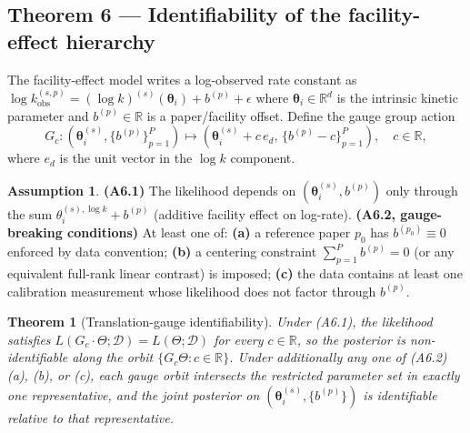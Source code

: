 \documentclass[12pt]{article}
\theoremstyle{plain}
\newtheorem{theorem}{Theorem}
\theoremstyle{definition}
\newtheorem{assumption}{Assumption}
\theoremstyle{remark}
\newcommand{\R}{\mathbb{R}}
\begin{document}
\subsection{Theorem 6 --- Identifiability of the facility-effect hierarchy}\label{sec:thm6}

The facility-effect model writes a log-observed rate constant as
$\log k_{\mathrm{obs}}^{(s,p)}=(\log k)^{(s)}(\boldsymbol\theta_i)+
b^{(p)}+\epsilon$ where $\boldsymbol\theta_i\in\R^d$ is the intrinsic
kinetic parameter and $b^{(p)}\in\R$ is a paper/facility offset.
Define the gauge group action
\[
G_c:(\boldsymbol\theta_i^{(s)},\{b^{(p)}\}_{p=1}^P) \mapsto
 (\boldsymbol\theta_i^{(s)}+c\,e_d,\,\{b^{(p)}-c\}_{p=1}^P),\quad c\in\R,
\]
where $e_d$ is the unit vector in the $\log k$ component.

\begin{assumption}\label{ass:thm6}
\textbf{(A6.1)} The likelihood depends on
$(\boldsymbol\theta_i^{(s)},b^{(p)})$ only through the sum
$\theta_i^{(s),\log k}+b^{(p)}$ (additive facility effect on
log-rate).
\textbf{(A6.2, gauge-breaking conditions)} At least one of:
\textbf{(a)} a reference paper $p_0$ has $b^{(p_0)}\equiv 0$ enforced
by data convention;
\textbf{(b)} a centering constraint $\sum_{p=1}^P b^{(p)}=0$ (or any
equivalent full-rank linear contrast) is imposed;
\textbf{(c)} the data contains at least one calibration measurement
whose likelihood does not factor through $b^{(p)}$.
\end{assumption}

\begin{theorem}[Translation-gauge identifiability]\label{thm:facility}
Under (A6.1), the likelihood satisfies $L(G_c\cdot\Theta;\mathcal{D})
=L(\Theta;\mathcal{D})$ for every $c\in\R$, so the posterior is
non-identifiable along the orbit $\{G_c\Theta:c\in\R\}$.  Under
\emph{additionally} any one of (A6.2)(a), (b), or (c), each gauge orbit
intersects the restricted parameter set in exactly one representative, and
the joint posterior on $(\boldsymbol\theta_i^{(s)},\{b^{(p)}\})$ is
identifiable relative to that representative.
\end{theorem}
\end{document}
